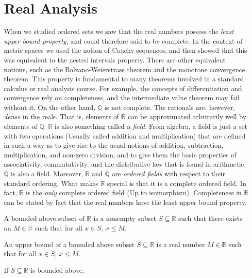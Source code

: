 \chapter{Real Analysis}
    When we studied ordered sets we saw that the real numbers possess the
    \textit{least upper bound property}, and could therefore said to be
    complete. In the context of metric spaces we used the notion of Cauchy
    sequences, and then showed that this was equivalent to the nested intervals
    property. There are other equivalent notions, such as the
    Bolzano-Weierstrass theorem and the monotone convergence theorem.
    This property is fundamental to many theorems involved in a standard
    calculus or real analysis course. For example, the concepts of
    differentiation and convergence rely on completeness, and the intermediate
    value theorem may fail without it. On the other hand, $\mathbb{Q}$ is not
    complete. The rationals are, however, \textit{dense} in the reals. That is,
    elements of $\mathbb{R}$ can be approximated arbitrarily well by elements of
    $\mathbb{Q}$. $\mathbb{R}$ is also something called a \textit{field}. From
    algebra, a field is just a set with two operations (Usually called addition
    and multiplication) that are defined in such a way as to give rise to the
    usual notions of addition, subtraction, multiplication, and non-zero
    division, and to give them the basic properties of associativity,
    commutativity, and the distributive law that is found in arithmetic.
    $\mathbb{Q}$ is also a field. Moreover, $\mathbb{R}$ and $\mathbb{Q}$ are
    \textit{ordered fields} with respect to their standard ordering. What makes
    $\mathbb{R}$ special is that it is a complete ordered field. In fact,
    $\mathbb{R}$ is the \textit{only} complete ordered field (Up to
    isomorphism). Completeness in $\mathbb{R}$ can be stated by fact that the
    real numbers have the least upper bound property.
    \begin{definition}
        A bounded above subset of $\mathbb{R}$ is a nonempty subset
        $S\subseteq{\mathbb{R}}$ such that there exists an $M\in\mathbb{R}$ such
        that for all $x\in{S}$, $x\leq{M}$.
    \end{definition}
    \begin{definition}
        An upper bound of a bounded above subset $S\subseteq\mathbb{R}$ is a
        real number $M\in\mathbb{R}$ such that for all $x\in{S}$, $x\leq{M}$.
    \end{definition}
            If $S\subseteq\mathbb{R}$ is bounded above,
